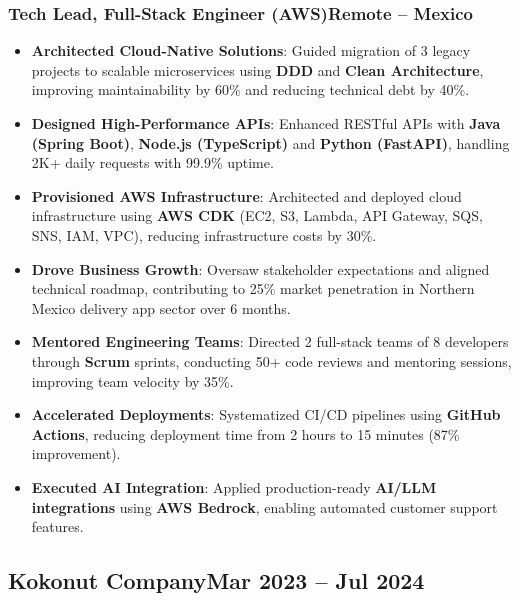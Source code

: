 \documentclass[a4paper,10pt]{article}
\newcommand{\kw}[1]{\textbf{\textcolor{keyword}{#1}}}
\newcommand{\tech}[1]{\textbf{\textcolor{tech}{#1}}}
\begin{document}
\subsubsection*{\small Tech Lead, Full-Stack Engineer (AWS)\hfill Remote -- Mexico}
\begin{itemize}[noitemsep, leftmargin=*]
    \item \textbf{Architected Cloud-Native Solutions}: Guided migration of 3 legacy projects to scalable microservices using \kw{DDD} and \kw{Clean Architecture}, improving maintainability by 60\% and reducing technical debt by 40\%.
    \item \textbf{Designed High-Performance APIs}: Enhanced RESTful APIs with \tech{Java (Spring Boot)}, \tech{Node.js (TypeScript)} and \tech{Python (FastAPI)}, handling 2K+ daily requests with 99.9\% uptime.
    \item \textbf{Provisioned AWS Infrastructure}: Architected and deployed cloud infrastructure using \tech{AWS CDK} (EC2, S3, Lambda, API Gateway, SQS, SNS, IAM, VPC), reducing infrastructure costs by 30\%.
    \item \textbf{Drove Business Growth}: Oversaw stakeholder expectations and aligned technical roadmap, contributing to 25\% market penetration in Northern Mexico delivery app sector over 6 months.
    \item \textbf{Mentored Engineering Teams}: Directed 2 full-stack teams of 8 developers through \kw{Scrum} sprints, conducting 50+ code reviews and mentoring sessions, improving team velocity by 35\%.
    \item \textbf{Accelerated Deployments}: Systematized CI/CD pipelines using \tech{GitHub Actions}, reducing deployment time from 2 hours to 15 minutes (87\% improvement).
    \item \textbf{Executed AI Integration}: Applied production-ready \kw{AI/LLM integrations} using \tech{AWS Bedrock}, enabling automated customer support features.
\end{itemize}

\subsection*{\small Kokonut Company\hfill\textbf{Mar 2023 -- Jul 2024}}
\end{document}
